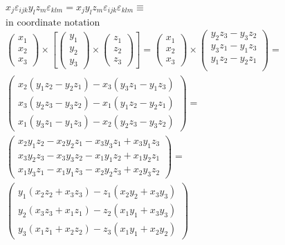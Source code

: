 \begin{itemize}
{\begin{equation}
\begin{split}
x_j  \varepsilon_{ijk} y_l z_m\varepsilon_{klm}   =
x_j y_l z_m  \varepsilon_{ijk} \varepsilon_{klm}   \equiv \\
\textrm{in coordinate notation}\\
\begin{pmatrix}
x_1 \\ x_2\\ x_3
\end{pmatrix}
\times
\left[
\begin{pmatrix}
y_1 \\y_2\\y_3
\end{pmatrix}
\times
\begin{pmatrix}
z_1 \\z_2\\z_3
\end{pmatrix}
\right] =
\begin{pmatrix}
x_1 \\ x_2\\ x_3
\end{pmatrix}
\times
\begin{pmatrix}
y_2z_3 -y_3z_2 \\
y_3z_1 -y_1z_3 \\
y_1z_2 -y_2z_1 \\
\end{pmatrix}
 =  \\
\begin{pmatrix}
x_2 (y_1z_2 -y_2z_1) - x_3(y_3z_1 -y_1z_3) \\
x_3 (y_2z_3 -y_3z_2) - x_1(y_1z_2 -y_2z_1) \\
x_1 (y_3z_1 -y_1z_3) - x_2(y_2z_3 -y_3z_2)
\end{pmatrix}
 =  \\
\begin{pmatrix}
x_2 y_1z_2 -x_2y_2z_1 - x_3y_3z_1 +x_3y_1z_3 \\
x_3 y_2z_3 -x_3y_3z_2 - x_1y_1z_2 +x_1y_2z_1 \\
x_1 y_3z_1 -x_1y_1z_3 - x_2y_2z_3 +x_2y_3z_2
\end{pmatrix}
 =  \\
\begin{pmatrix}
y_1 (x_2z_2 + x_3z_3) - z_1(x_2y_2 + x_3y_3) \\
y_2 (x_3z_3 + x_1z_1) - z_2(x_1y_1 + x_3y_3) \\
y_3 (x_1z_1 + x_2z_2) - z_3(x_1y_1 + x_2y_2)
\end{pmatrix}
\end{split}
\end{equation}
}
\end{itemize}

